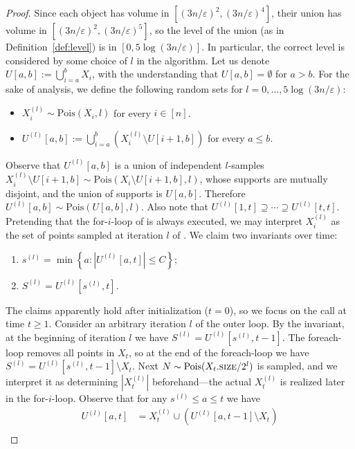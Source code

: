 \documentclass[11pt]{article}
\def\set#1{\left\{ #1 \right\}}
\def\card#1{\left\lvert #1 \right\rvert}		%
\newcommand{\size}{\textsc{size}}
\newcommand{\Pois}{\mathrm{Pois}}
\newcommand{\eps}{\varepsilon}
\begin{document}
\begin{proof}
    Since each object has volume in $[(3n/\eps)^2, (3n/\eps)^4]$, their union has volume in $[(3n/\eps)^2, (3n/\eps)^5]$, so the level of the union (as in Definition~\ref{def:level}) is in $[0, 5\log(3n/\eps)]$. In particular, the correct level is considered by some choice of $l$ in the algorithm.
%
    Let us denote $U[a,b] := \bigcup_{i=a}^b X_i$, with the understanding that $U[a,b] = \emptyset$ for $a > b$. For the sake of analysis, we define the following random sets for $l = 0, \dots, 5 \log(3n/\eps)$:
    \begin{itemize}
        \item $X_i^{(l)} \sim \Pois(X_i, l)$ for every $i \in [n]$.
        \item $U^{(l)}[a,b] := \bigcup_{i=a}^{b} ( X_i^{(l)} \setminus U[i+1,b] )$ for every $a \leq b$.
    \end{itemize}
    Observe that $U^{(l)}[a,b]$ is a union of independent $l$-samples $X_i^{(l)} \setminus U[i+1,b] \sim \Pois(X_i \setminus U[i+1,b], l)$, whose supports are mutually disjoint, and the union of supports is $U[a,b]$. Therefore $U^{(l)}[a,b] \sim \Pois(U[a,b], l)$. Also note that $U^{(l)}[1,t] \supseteq \cdots \supseteq U^{(l)}[t,t]$.
%
    Pretending that the for-$i$-loop of \ins is always executed, we may interpret $X_i^{(l)}$ as the set of points sampled at iteration $l$ of . We claim two invariants over time:
    \begin{enumerate}[label={(\roman*)}]
        \item $s^{(l)} = \min \set{a : \card{U^{(l)}[a,t]} \leq C }$;
        \item $S^{(l)} = U^{(l)}[s^{(l)}, t]$.
    \end{enumerate}
%
    The claims apparently hold after initialization ($t = 0$), so we focus on the call  at time $t \geq 1$. Consider an arbitrary iteration $l$ of the outer loop. By the invariant, at the beginning of iteration $l$ we have $S^{(l)} = U^{(l)}[s^{(l)}, t-1]$. The foreach-loop removes all points in $X_t$, so at the end of the foreach-loop we have $S^{(l)} = U^{(l)}[s^{(l)}, t-1] \setminus X_t$. Next $N \sim \Pois(X_t.\size/2^l)$ is sampled, and we interpret it as determining $|X_t^{(l)}|$ beforehand---the actual $X_t^{(l)}$ is realized later in the for-$i$-loop. 
%
    Observe that for any $s^{(l)} \le a \le t$ we have
    \begin{align*}
        U^{(l)}[a,t]
        &= X_t^{(l)} \cup (U^{(l)}[a, t-1] \setminus X_t) \\

\end{align*}
\end{proof}
\end{document}
